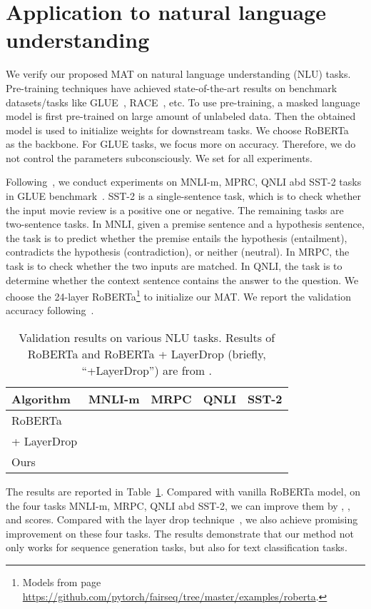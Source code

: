 \documentclass{article}
\begin{document}
\section{Application to natural language understanding}
We verify our proposed MAT on natural language understanding (NLU) tasks. Pre-training techniques have achieved state-of-the-art results on benchmark datasets/tasks like GLUE~\cite{wang2019glue}, RACE~\cite{lai2017large}, etc. To use pre-training, a masked language model is first pre-trained on large amount of unlabeled data. Then the obtained model is used to initialize weights for downstream tasks. We choose RoBERTa~\cite{liu2019roberta} as the backbone. For GLUE tasks, we focus more on accuracy. Therefore, we do not control the parameters subconsciously. We set  for all experiments.

Following~\cite{fan2020reducing}, we conduct experiments on MNLI-m, MPRC, QNLI abd SST-2 tasks in GLUE benchmark~\cite{wang2019glue}. SST-2 is a single-sentence task, which is to check whether the input movie review is a positive one or negative. The remaining tasks are two-sentence tasks. In MNLI, given a premise sentence and a hypothesis sentence, the task is to predict whether the premise entails the hypothesis (entailment), contradicts the hypothesis (contradiction), or neither (neutral). In MRPC, the task is to check whether the two inputs are matched. In QNLI, the task is to determine whether the context sentence contains the answer to the question. 
We choose the 24-layer RoBERTa\footnote{Models from page \url{https://github.com/pytorch/fairseq/tree/master/examples/roberta}.} to initialize our MAT. We report the validation accuracy following~\cite{fan2020reducing}. 

\begin{table}[!htpb]
\centering
\caption{Validation results on various NLU tasks. Results of RoBERTa and RoBERTa + LayerDrop (briefly, ``+LayerDrop'') are from \cite{fan2020reducing}.} 
\begin{tabular}{lcccc}
\toprule
Algorithm & MNLI-m & MRPC & QNLI & SST-2 \\
\midrule
RoBERTa &  &  &  &  \\
+ LayerDrop &  &  &  &  \\
\midrule
Ours &  &  &  &  \\
\bottomrule
\end{tabular}
\label{tab:result_glue}
\end{table}

The results are reported in Table~\ref{tab:result_glue}. Compared with vanilla RoBERTa model, on the four tasks MNLI-m, MRPC, QNLI abd SST-2, we can improve them by , ,  and  scores. Compared with the layer drop technique~\cite{fan2020reducing}, we also achieve promising improvement on these four tasks. The results demonstrate that our method not only works for sequence generation tasks, but also for text classification tasks. 
\end{document}
